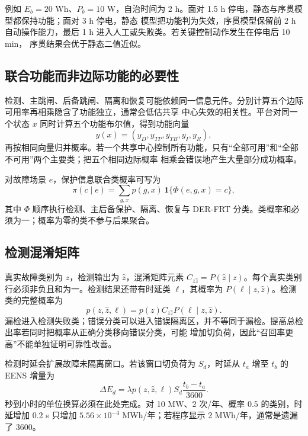 例如 $E_b=20$ Wh、$P_b=10$ W，自治时间为 2 h。面对 1.5 h 停电，静态与序贯模型都保持功能；面对 3 h 停电，静态
模型把功能判为失效，序贯模型保留前 2 h 自动操作能力，最后 1 h 进入人工或失败类。若关键控制动作发生在停电后 10 min，
序贯结果会优于静态二值近似。

\subsection{联合功能而非边际功能的必要性}
检测、主跳闸、后备跳闸、隔离和恢复可能依赖同一信息元件。分别计算五个边际可用率再相乘隐含了功能独立，通常会低估共享
中心失效的相关性。平台对同一个状态 $x$ 同时计算五个功能布尔值，得到功能向量
\begin{equation}
 y(x)=(y_D,y_{TP},y_{TB},y_I,y_R),
\end{equation}
再按相同向量归并概率。若一个共享中心控制所有功能，只有“全部可用”和“全部不可用”两个主要类；把五个相同边际概率
相乘会错误地产生大量部分成功概率。

对故障场景 $e$，保护信息联合类概率可写为
\begin{equation}
 \pi(c\mid e)=\sum_{g,x}p(g,x)\,
 \mathbf1\{\Phi(e,g,x)=c\},
\end{equation}
其中 $\Phi$ 顺序执行检测、主后备保护、隔离、恢复与 DER-FRT 分类。类概率和必须为一；概率为零的类不参与后果聚合。

\subsection{检测混淆矩阵}
真实故障类别为 $z$，检测输出为 $\widehat z$，混淆矩阵元素
$C_{z\widehat z}=P(\widehat z\mid z)$。每个真实类别行必须非负且和为一。检测结果还带有时延类 $\ell$，其概率为
$P(\ell\mid z,\widehat z)$。检测类的完整概率为
\begin{equation}
 p(z,\widehat z,\ell)=p(z)C_{z\widehat z}P(\ell\mid z,\widehat z).
\end{equation}
漏检进入检测失败类；错误分类可以进入错误隔离区，并不等同于漏检。提高总检出率若同时把概率从正确分类移向错误分类，可能
增加切负荷，因此“召回率更高”不能单独证明可靠性改善。

检测时延会扩展故障未隔离窗口。若该窗口切负荷为 $S_d$，时延从 $t_a$ 增至 $t_b$ 的 EENS 增量为
\begin{equation}
 \Delta E_d=\lambda p(z,\widehat z,\ell)S_d
 \frac{t_b-t_a}{3600}.
\end{equation}
秒到小时的单位换算必须在此处完成。对 10 MW、2 次/年、概率 0.5 的类别，时延增加 0.2 s 只增加
$5.56\times10^{-4}$ MWh/年；若程序显示 2 MWh/年，通常是遗漏了 $3600$。

